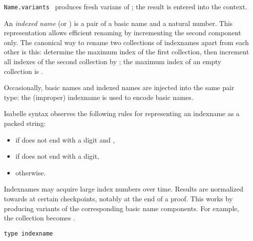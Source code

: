 \begin{isabellebody}
\begin{isamarkuptext}
\begin{description}
  \item \verb|Name.variants|~ produces fresh
  varians of ; the result is entered into the context.

  \end{description}%
\end{isamarkuptext}%
\isamarkuptrue%
%
\endisatagmlref
{\isafoldmlref}%
%
\isadelimmlref
%
\endisadelimmlref
%
\isamarkuptrue%
%
\begin{isamarkuptext}%
An \emph{indexed name} (or ) is a pair of a basic
  name and a natural number.  This representation allows efficient
  renaming by incrementing the second component only.  The canonical
  way to rename two collections of indexnames apart from each other is
  this: determine the maximum index  of the first
  collection, then increment all indexes of the second collection by
  ; the maximum index of an empty collection is
  .

  Occasionally, basic names and indexed names are injected into the
  same pair type: the (improper) indexname  is used
  to encode basic names.

  \medskip Isabelle syntax observes the following rules for
  representing an indexname  as a packed string:

  \begin{itemize}

  \item {} if  does not end with a digit and ,

  \item {} if  does not end with a digit,

  \item {} otherwise.

  \end{itemize}

  Indexnames may acquire large index numbers over time.  Results are
  normalized towards  at certain checkpoints, notably at
  the end of a proof.  This works by producing variants of the
  corresponding basic name components.  For example, the collection
   becomes .%
\end{isamarkuptext}%
\isamarkuptrue%
%
\isadelimmlref
%
\endisadelimmlref
%
\isatagmlref
%
\begin{isamarkuptext}%
\begin{mldecls}
  \verb|type indexname| \\
  \end{mldecls}


\end{isamarkuptext}
\end{isabellebody}
